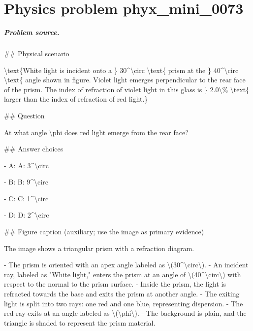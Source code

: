 
\chapter{Physics problem phyx\_mini\_0073}
\label{ch:PhyXMiniProblems_problem_phyx_mini_0073}

\paragraph{Problem source.}
\#\# Physical scenario

\textbackslash{}text\{White light is incident onto a \} 30\textasciicircum{}\textbackslash{}circ \textbackslash{}text\{ prism at the \} 40\textasciicircum{}\textbackslash{}circ \textbackslash{}text\{ angle shown in figure. Violet light emerges perpendicular to the rear face of the prism. The index of refraction of violet light in this glass is \} 2.0\textbackslash{}\% \textbackslash{}text\{ larger than the index of refraction of red light.\}

\#\# Question

At what angle \textbackslash{}phi does red light emerge from the rear face?

\#\# Answer choices

- A: A: 3\textasciicircum{}\textbackslash{}circ

- B: B: 9\textasciicircum{}\textbackslash{}circ

- C: C: 1\textasciicircum{}\textbackslash{}circ

- D: D: 2\textasciicircum{}\textbackslash{}circ

\#\# Figure caption (auxiliary; use the image as primary evidence)

The image shows a triangular prism with a refraction diagram. 

- The prism is oriented with an apex angle labeled as \textbackslash{}(30\textasciicircum{}\textbackslash{}circ\textbackslash{}).
- An incident ray, labeled as "White light," enters the prism at an angle of \textbackslash{}(40\textasciicircum{}\textbackslash{}circ\textbackslash{}) with respect to the normal to the prism surface.
- Inside the prism, the light is refracted towards the base and exits the prism at another angle.
- The exiting light is split into two rays: one red and one blue, representing dispersion.
- The red ray exits at an angle labeled as \textbackslash{}(\textbackslash{}phi\textbackslash{}).
- The background is plain, and the triangle is shaded to represent the prism material.

